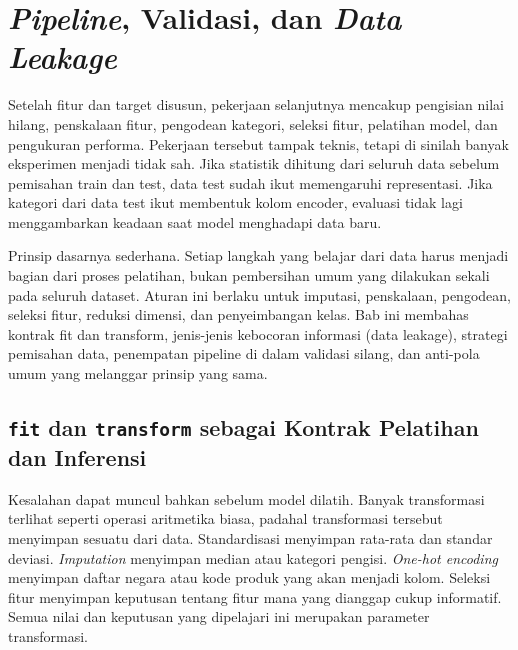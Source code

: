 \chapter{\texorpdfstring{\emph{Pipeline}, Validasi, dan \emph{Data Leakage}}{Pipeline, Validasi, dan Data Leakage}}\label{pipeline-validasi-dan-data-leakage}

Setelah fitur dan target disusun, pekerjaan selanjutnya mencakup pengisian nilai hilang, penskalaan fitur, pengodean kategori, seleksi fitur, pelatihan model, dan pengukuran performa. Pekerjaan tersebut tampak teknis, tetapi di sinilah banyak eksperimen menjadi tidak sah. Jika statistik dihitung dari seluruh data sebelum pemisahan train dan test, data test sudah ikut memengaruhi representasi. Jika kategori dari data test ikut membentuk kolom encoder, evaluasi tidak lagi menggambarkan keadaan saat model menghadapi data baru.

Prinsip dasarnya sederhana. Setiap langkah yang belajar dari data harus menjadi bagian dari proses pelatihan, bukan pembersihan umum yang dilakukan sekali pada seluruh dataset. Aturan ini berlaku untuk imputasi, penskalaan, pengodean, seleksi fitur, reduksi dimensi, dan penyeimbangan kelas. Bab ini membahas kontrak fit dan transform, jenis-jenis kebocoran informasi (data leakage), strategi pemisahan data, penempatan pipeline di dalam validasi silang, dan anti-pola umum yang melanggar prinsip yang sama.

\section{\texorpdfstring{\texttt{fit} dan \texttt{transform} sebagai Kontrak Pelatihan dan Inferensi}{fit dan transform sebagai Kontrak Pelatihan dan Inferensi}}\label{fit-dan-transform-sebagai-kontrak-pelatihan-dan-inferensi}

Kesalahan dapat muncul bahkan sebelum model dilatih. Banyak transformasi terlihat seperti operasi aritmetika biasa, padahal transformasi tersebut menyimpan sesuatu dari data. Standardisasi menyimpan rata-rata dan standar deviasi. \emph{Imputation} menyimpan median atau kategori pengisi. \emph{One-hot encoding} menyimpan daftar negara atau kode produk yang akan menjadi kolom. Seleksi fitur menyimpan keputusan tentang fitur mana yang dianggap cukup informatif. Semua nilai dan keputusan yang dipelajari ini merupakan parameter transformasi.


